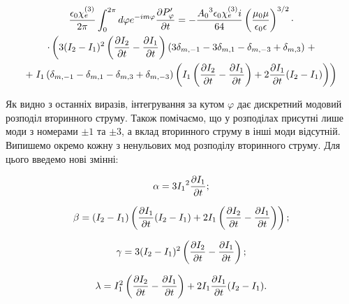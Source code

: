 \begin{equation*} \begin{gathered}
\frac{\epsilon_0 \chi_e^{(3)}}{2 \pi} \int_{0}^{2 \pi} d \varphi 
e^{-im \varphi} \frac{\partial P_\varphi^\prime}{\partial t} = 
- \frac{ {A_0}^3 \epsilon_0 \chi_e^{(3)}  i}{ 64 }
\left( \frac{\mu_0 \mu} {\epsilon_0 \epsilon} \right)^{3/2} \cdot \\ 
\cdot \left( 3 ( I_2 - I_1 )^2 \left( \frac{\partial I_2}{\partial t} - 
\frac{\partial I_1}{\partial t} \right) \left( 3 \delta_{m,-1} - 3 \delta_{m,1} - 
\delta_{m,-3} + \delta_{m,3} \right) \right. + \\
+ \left. I_1 \left( \delta_{m,-1} - \delta_{m,1} - 
\delta_{m,3} + \delta_{m,-3} \right) \left( 
I_1 \left( \frac{\partial I_2}{\partial t} - \frac{\partial I_1}{\partial t} \right) + 
2 \frac{\partial I_1}{\partial t} (I_2 - I_1) \right) \right)
\end{gathered} \end{equation*}

Як видно з останніх виразів, інтегрування за кутом $ \varphi $ дає дискретний 
модовий розподіл вторинного струму.  Також помічаємо, що у розподілах присутні 
лише моди з номерами $ \pm 1 $ та $ \pm 3 $, а вклад вторинного струму в 
інші моди відсутній. Випишемо окремо кожну з ненульових мод розподілу 
вторинного струму. Для цього введемо нові змінні:

\begin{equation} \begin{aligned} \label{eq:alpha}
\alpha = 3 {I_1}^2 \frac{\partial I_1}{\partial t};
\end{aligned} \end{equation}

\begin{equation} \begin{aligned} \label{eq:beta}
\beta = ( I_2 - I_1 ) \left( \frac{\partial I_1}{\partial t} ( I_2 - I_1 ) + 
2 I_1 \left( \frac{\partial I_2}{\partial t} - \frac{\partial I_1}{\partial t} \right) \right);
\end{aligned} \end{equation}

\begin{equation} \begin{aligned} \label{eq:gamma}
\gamma = 3 ( I_2 - I_1 )^2 \left( \frac{\partial I_2}{\partial t} - \frac{\partial I_1}{\partial t} \right);
\end{aligned} \end{equation}

\begin{equation} \begin{aligned} \label{eq:lambda}
\lambda = I_1^2 \left( \frac{\partial I_2}{\partial t} - 
\frac{\partial I_1}{\partial t} \right) + 2 I_1 \frac{\partial I_1}{\partial t} (I_2 - I_1).
\end{aligned} \end{equation}

